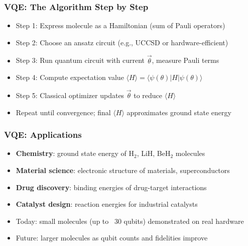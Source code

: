 \begin{frame}[fragile]\frametitle{VQE: The Algorithm Step by Step}
\begin{itemize}
\item Step 1: Express molecule as a Hamiltonian (sum of Pauli operators)
\item Step 2: Choose an ansatz circuit (e.g., UCCSD or hardware-efficient)
\item Step 3: Run quantum circuit with current $\vec{\theta}$, measure Pauli terms
\item Step 4: Compute expectation value $\langle H \rangle = \langle \psi(\theta) | H | \psi(\theta) \rangle$
\item Step 5: Classical optimizer updates $\vec{\theta}$ to reduce $\langle H \rangle$
\item Repeat until convergence; final $\langle H \rangle$ approximates ground state energy
\end{itemize}
\end{frame}

\begin{frame}[fragile]\frametitle{VQE: Applications}
\begin{itemize}
\item \textbf{Chemistry}: ground state energy of H$_2$, LiH, BeH$_2$ molecules
\item \textbf{Material science}: electronic structure of materials, superconductors
\item \textbf{Drug discovery}: binding energies of drug-target interactions
\item \textbf{Catalyst design}: reaction energies for industrial catalysts
\item Today: small molecules (up to ~30 qubits) demonstrated on real hardware
\item Future: larger molecules as qubit counts and fidelities improve
\end{itemize}
\end{frame}

